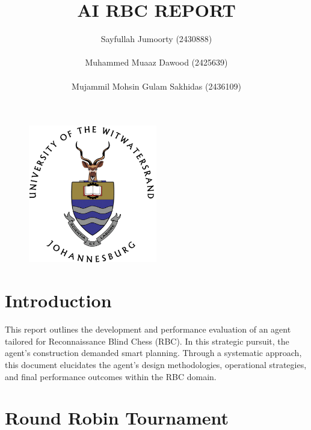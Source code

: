 \documentclass[10pt]{article}
\begin{document}
\title{AI RBC REPORT \\ 
}
\author{Sayfullah Jumoorty (2430888) \\ \\ Muhammed Muaaz Dawood (2425639) \\ \\ Mujammil Mohsin Gulam Sakhidas (2436109)}
\maketitle 
\pagestyle{fancy}
\fancyhf{}
\fancyhead[R]{\thepage}

\begin{figure}[H]
\centering
\includegraphics[width=0.5\textwidth]{logo-round.png}
\label{fig:LOGO}
\end{figure}

\newpage

\tableofcontents

\newpage

\section{Introduction}

This report outlines the development and performance evaluation of an agent tailored for Reconnaissance Blind Chess (RBC). In this strategic pursuit, the agent's construction demanded smart planning. Through a systematic approach, this document elucidates the agent's design methodologies, operational strategies, and final performance outcomes within the RBC domain.

\section{Round Robin Tournament}
\end{document}
